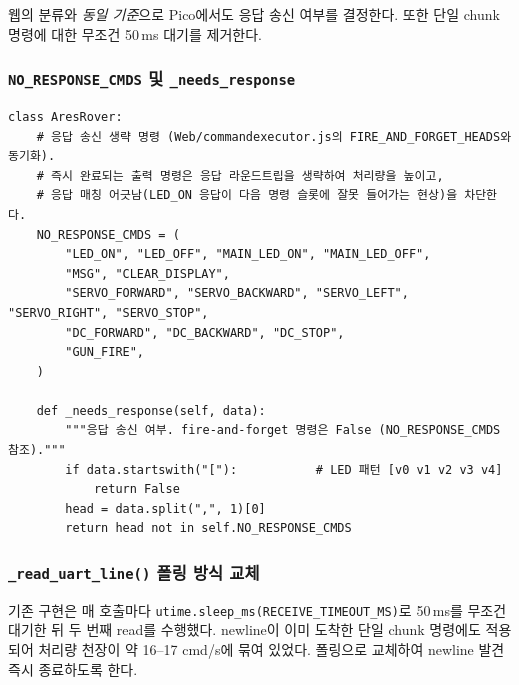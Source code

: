 \documentclass[11pt, oneside]{article}
\begin{document}
웹의 분류와 \emph{동일 기준}으로 Pico에서도 응답 송신 여부를 결정한다.
또한 단일 chunk 명령에 대한 무조건 50\,ms 대기를 제거한다.

\subsubsection*{\texttt{NO\_RESPONSE\_CMDS} 및 \texttt{\_needs\_response}}

\begin{verbatim}
class AresRover:
    # 응답 송신 생략 명령 (Web/commandexecutor.js의 FIRE_AND_FORGET_HEADS와 동기화).
    # 즉시 완료되는 출력 명령은 응답 라운드트립을 생략하여 처리량을 높이고,
    # 응답 매칭 어긋남(LED_ON 응답이 다음 명령 슬롯에 잘못 들어가는 현상)을 차단한다.
    NO_RESPONSE_CMDS = (
        "LED_ON", "LED_OFF", "MAIN_LED_ON", "MAIN_LED_OFF",
        "MSG", "CLEAR_DISPLAY",
        "SERVO_FORWARD", "SERVO_BACKWARD", "SERVO_LEFT", "SERVO_RIGHT", "SERVO_STOP",
        "DC_FORWARD", "DC_BACKWARD", "DC_STOP",
        "GUN_FIRE",
    )

    def _needs_response(self, data):
        """응답 송신 여부. fire-and-forget 명령은 False (NO_RESPONSE_CMDS 참조)."""
        if data.startswith("["):           # LED 패턴 [v0 v1 v2 v3 v4]
            return False
        head = data.split(",", 1)[0]
        return head not in self.NO_RESPONSE_CMDS
\end{verbatim}

\subsubsection*{\texttt{\_read\_uart\_line()} 폴링 방식 교체}

기존 구현은 매 호출마다 \texttt{utime.sleep\_ms(RECEIVE\_TIMEOUT\_MS)}로
50\,ms를 무조건 대기한 뒤 두 번째 read를 수행했다. newline이 이미
도착한 단일 chunk 명령에도 적용되어 처리량 천장이 약 16--17 cmd/s에
묶여 있었다. 폴링으로 교체하여 newline 발견 즉시 종료하도록 한다.
\end{document}
